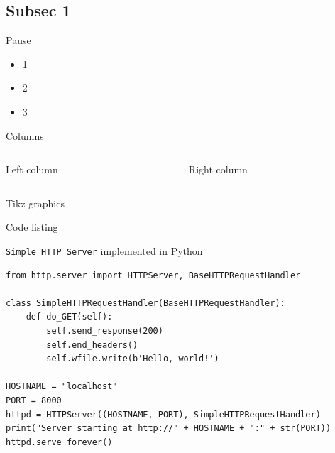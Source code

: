 \documentclass[compress,aspectratio=169]{beamer}
\begin{document}
\subsection{Subsec 1} %
\begin{frame}{Pause}
    \begin{itemize}
        \item 1
        \pause  %
        \item 2
        \pause
        \item 3
    \end{itemize}
\end{frame}

\begin{frame}{Columns}
    \begin{columns}
    \begin{column}{0.5\textwidth}
    Left column
    \end{column}
    \begin{column}{0.5\textwidth}
    Right column %
    \end{column}
    \end{columns}
\end{frame}

\begin{frame}{Tikz graphics}
\end{frame}

\begin{frame}[fragile]{Code listing}
	
	\texttt{Simple HTTP Server} implemented in Python
	
	\begin{tcolorbox}[title=Python]
		\footnotesize\begin{verbatim}
from http.server import HTTPServer, BaseHTTPRequestHandler

class SimpleHTTPRequestHandler(BaseHTTPRequestHandler):
	def do_GET(self):
		self.send_response(200)
		self.end_headers()
		self.wfile.write(b'Hello, world!')

HOSTNAME = "localhost"
PORT = 8000
httpd = HTTPServer((HOSTNAME, PORT), SimpleHTTPRequestHandler)
print("Server starting at http://" + HOSTNAME + ":" + str(PORT))
httpd.serve_forever()
		\end{verbatim}
	\end{tcolorbox}
\end{frame}
\end{document}
